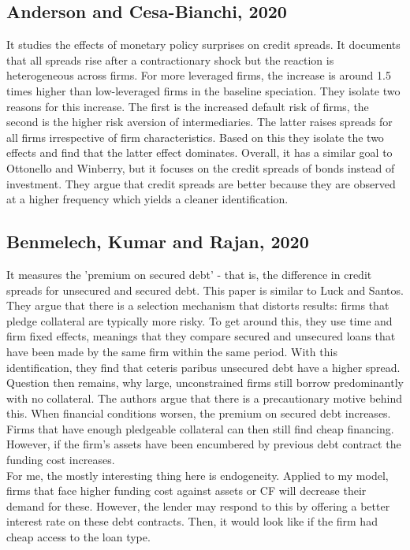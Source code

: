 \documentclass[12pt]{article}
\begin{document}
\subsection*{Anderson and Cesa-Bianchi, 2020}
It studies the effects of monetary policy surprises on credit spreads. It documents that all spreads rise after a contractionary shock but the reaction is heterogeneous across firms. For more leveraged firms, the increase is around 1.5 times higher than low-leveraged firms in the baseline speciation. They isolate two reasons for this increase. The first is the increased default risk of firms, the second is the higher risk aversion of intermediaries. The latter raises spreads for all firms irrespective of firm characteristics. Based on this they isolate the two effects and find that the latter effect dominates. Overall, it has a similar goal to Ottonello and Winberry, but it focuses on the credit spreads of bonds instead of investment. They argue that credit spreads are better because they are observed at a higher frequency which yields a cleaner identification. 

\subsection*{Benmelech, Kumar and Rajan, 2020 \checkmark}
It measures the 'premium on secured debt' - that is, the difference in credit spreads for unsecured and secured debt. This paper is similar to Luck and Santos. They argue that there is a selection mechanism that distorts results: firms that pledge collateral are typically more risky. To get around this, they use time and firm fixed effects, meanings that they compare secured and unsecured loans that have been made by the same firm within the same period. With this identification, they find that ceteris paribus unsecured debt have a higher spread. Question then remains, why large, unconstrained firms still borrow predominantly with no collateral. The authors argue that there is a precautionary motive behind this. When financial conditions worsen, the premium on secured debt increases. Firms that have enough pledgeable collateral can then still find cheap financing. However, if the firm's assets have been encumbered by previous debt contract the funding cost increases. \\
For me, the mostly interesting thing here is endogeneity. Applied to my model, firms that face higher funding cost against assets or CF will decrease their demand for these. However, the lender may respond to this by offering a better interest rate on these debt contracts. Then, it would look like if the firm had cheap access to the loan type. 
\end{document}
